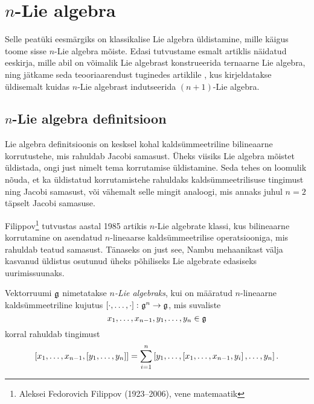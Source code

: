 

\section{\texorpdfstring{$n$}{n}-Lie algebra}

Selle peatüki eesmärgiks on klassikalise Lie algebra
üldistamine, mille käigus toome sisse $n$-Lie algebra mõiste.
Edasi tutvustame esmalt artiklis \cite{AMS:2011} näidatud eeskirja,
mille abil on võimalik Lie algebrast konstrueerida
ternaarne Lie algebra, ning jätkame seda teooriaarendust
tuginedes artiklile \cite{AKMS:2014}, kus kirjeldatakse
üldisemalt kuidas $n$-Lie algebrast indutseerida $(n+1)$-Lie
algebra.

\subsection{\texorpdfstring{$n$}{n}-Lie algebra definitsioon}

Lie algebra definitsioonis on kesksel kohal kaldsümmeetriline
bilineaarne korrutustehe, mis rahuldab Jacobi samasust.
Üheks viisiks Lie algebra mõistet üldistada, ongi just nimelt
tema korrutamise üldistamine. Seda tehes on loomulik nõuda, et
ka üldistatud korrutamistehe rahuldaks kaldsümmeetrilisuse
tingimust ning Jacobi samasust, või vähemalt selle mingit
analoogi, mis annaks juhul $n=2$ täpselt Jacobi samasuse.

Filippov\footnote{Aleksei Fedorovich Filippov (1923--2006),
vene matemaatik} tutvustas aastal 1985 artikis \cite{filippov1985}
$n$-Lie algebrate klassi, kus bilineaarne korrutamine on
asendatud $n$-lineaarse kaldsümmeetrilise operatsiooniga,
mis rahuldab teatud samasust. \cite{kasymov1987}
Tänaseks on just see, Nambu mehaanikast välja kasvanud
üldistus osutunud üheks põhiliseks Lie algebrate edasiseks
uurimissuunaks.

\begin{dfn}
    Vektorruumi $\mathfrak{g}$ nimetatakse \emph{$n$-Lie algebraks}, kui
    on määratud $n$-lineaarne kaldsümmeetriline kujutus
    $\left[ \cdot, \dots, \cdot \right] \colon \mathfrak{g}^n \to \mathfrak{g}$, mis
    suvaliste
    \[ x_1, \dots, x_{n-1}, y_1, \dots, y_n \in \mathfrak{g} \]
    korral rahuldab tingimust
    \begin{align}\label{id:filippov}
        \left[ x_1, \dots, x_{n-1}, \left[ y_1, \dots, y_n \right] \right] =
        \sum_{i=1}^n \left[
            y_1, \dots, \left[ x_1, \dots, x_{n-1}, y_i \right], \dots, y_n
        \right].
    \end{align}
\end{dfn}

